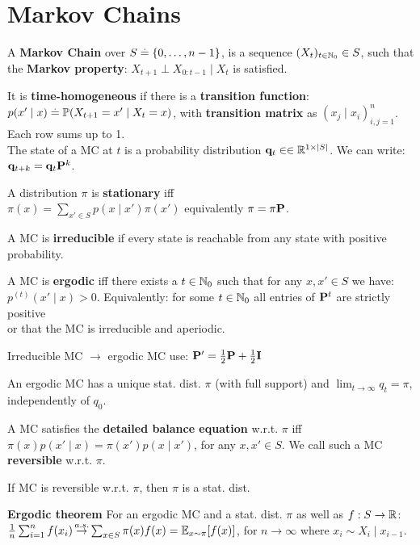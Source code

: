 \section{Markov Chains}
\begin{framed}
    A \textbf{Markov Chain} over $S \overset{.}{=} \{0, \dots, n-1\}$, is a sequence $(X_t)_{t \in \mathbb{N}_0} \in S$, such that the \textbf{Markov property}: $X_{t+1} \perp X_{0:t-1} \mid X_t$ is satisfied. 
\end{framed}
It is \textbf{time-homogeneous} if there is a \textbf{transition function}: $p(x' \mid x) \defeq \Pr{X_{t+1} = x' \mid X_t = x}$, with \textbf{transition matrix} as $\left(x_j \mid x_i \right)_{i, j = 1}^n$. Each row sums up to 1. \\
The state of a MC at $t$ is a probability distribution $\mathbf{q}_t \in \in \mathbb{R}^{1 \times \left| S \right|}$. We can write: $\mathbf{q}_{t+k} = \mathbf{q}_t \mathbf{P}^k$.
\begin{framed}
    A distribution $\pi$ is \textbf{stationary} iff\\ $\pi(x) = \sum_{x' \in S} p(x \mid x') \pi(x')$ equivalently $\mathbf{\pi} = \mathbf{\pi} \mathbf{P}$.
\end{framed}
A MC is \textbf{irreducible} if every state is reachable from any state with positive probability.
\begin{framed}
    A MC is \textbf{ergodic} iff there exists a $t \in \mathbb{N}_0$ such that for any $x, x' \in S$ we have: $p^{(t)}(x' \mid x) > 0$. Equivalently:
    for some $t \in \mathbb{N}_0$ all entries of $\mathbf{P}^t$ are strictly positive \\
    or that the MC is irreducible and aperiodic.
\end{framed}
Irreducible MC $\rightarrow$ ergodic MC use: $\mathbf{P}' = \frac{1}{2}\mathbf{P} + \frac{1}{2}\mathbf{I}$
\begin{framed}
    An ergodic MC has a unique stat. dist. $\pi$ (with full support) and $\lim_{t\to\infty} q_t = \pi$, independently of $q_0$.
\end{framed}
\begin{framed}
    A MC satisfies the \textbf{detailed balance equation} w.r.t. $\pi$ iff $\pi(x) p(x' \mid x) = \pi(x') p(x \mid x')$, for any $x, x' \in S$. We call such a MC \textbf{reversible} w.r.t. $\pi$.
\end{framed}
If MC is reversible w.r.t. $\pi$, then $\pi$ is a stat. dist.
\begin{framed}
    \textbf{Ergodic theorem} For an ergodic MC and a stat. dist. $\pi$ as well as $f : S \to \mathbb{R}$:
    $\frac{1}{n} \sum_{i=1}^n f(x_i) \almostsurely \sum_{x \in S} \pi(x) f(x) = \E[x \sim \pi]{f(x)}$, for $n\to\infty$ where $x_i \sim X_i \mid x_{i-1}$.
\end{framed}
